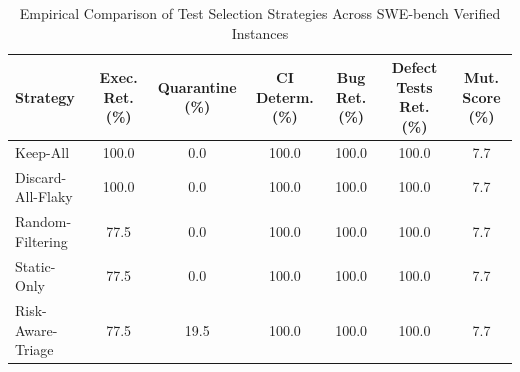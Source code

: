 \begin{table}[t]
\centering
\caption{Empirical Comparison of Test Selection Strategies Across SWE-bench Verified Instances}
\label{tab:strategy_comparison}
\begin{tabular}{lcccccc}
\toprule
\textbf{Strategy} & \textbf{Exec. Ret. (\%)} & \textbf{Quarantine (\%)} & \textbf{CI Determ. (\%)} & \textbf{Bug Ret. (\%)} & \textbf{Defect Tests Ret. (\%)} & \textbf{Mut. Score (\%)} \\
\midrule
Keep-All & 100.0 & 0.0 & 100.0 & 100.0 & 100.0 & 7.7 \\
Discard-All-Flaky & 100.0 & 0.0 & 100.0 & 100.0 & 100.0 & 7.7 \\
Random-Filtering & 77.5 & 0.0 & 100.0 & 100.0 & 100.0 & 7.7 \\
Static-Only & 77.5 & 0.0 & 100.0 & 100.0 & 100.0 & 7.7 \\
Risk-Aware-Triage & 77.5 & 19.5 & 100.0 & 100.0 & 100.0 & 7.7 \\
\bottomrule
\end{tabular}
\end{table}